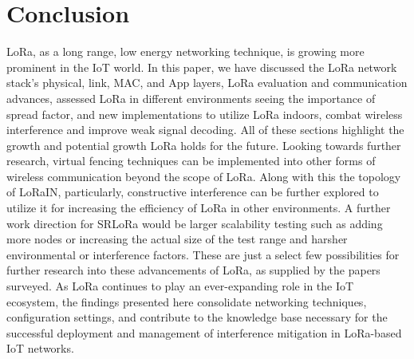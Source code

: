 \documentclass[sigsmall]{acmart}
\begin{document}
\section*{Conclusion}
LoRa, as a long range, low energy networking technique, is growing more prominent in the IoT world. In this paper, we have discussed the LoRa network stack’s physical, link, MAC, and App layers, LoRa evaluation and communication advances, assessed LoRa in different environments seeing the importance of spread factor, and new implementations to utilize LoRa indoors, combat wireless interference and improve weak signal decoding. All of these sections highlight the growth and potential growth LoRa holds for the future. Looking towards further research, virtual fencing techniques can be implemented into other forms of wireless communication beyond the scope of LoRa. Along with this the topology of LoRaIN, particularly, constructive interference can be further explored to utilize it for increasing the efficiency of LoRa in other environments. A further work direction for SRLoRa would be larger scalability testing such as adding more nodes or increasing the actual size of the test range and harsher environmental or interference factors. These are just a select few possibilities for further research into these advancements of LoRa, as supplied by the papers surveyed. As LoRa continues to play an ever-expanding role in the IoT ecosystem, the findings presented here consolidate networking techniques, configuration settings, and contribute to the knowledge base necessary for the successful deployment and management of interference mitigation in LoRa-based IoT networks.



\end{document}
